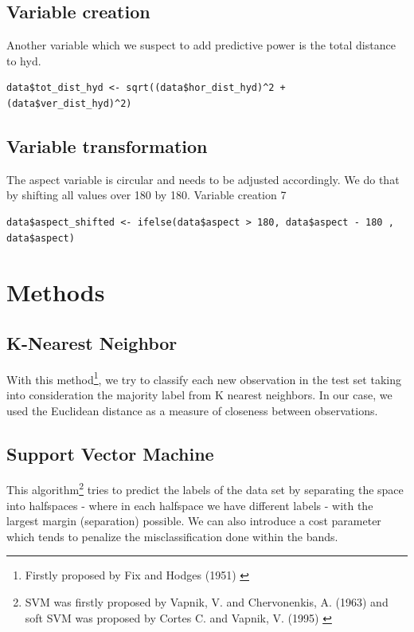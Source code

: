 \documentclass[paper=a4, fontsize=12pt]{scrartcl}
\numberwithin{equation}{section}
\numberwithin{figure}{section}
\numberwithin{table}{section}
\begin{document}
\subsection{Variable creation}
Another variable which we suspect to add predictive power is the total distance to hyd.\\
\begin{lstlisting}
data$tot_dist_hyd <- sqrt((data$hor_dist_hyd)^2 + (data$ver_dist_hyd)^2)
\end{lstlisting}

\subsection{Variable transformation}
The aspect variable is circular and needs to be adjusted accordingly. We do that by shifting all values over 180 by 180.
Variable creation 7
\begin{lstlisting}
data$aspect_shifted <- ifelse(data$aspect > 180, data$aspect - 180 , data$aspect)
\end{lstlisting}





\newpage




\section{Methods}
\subsection{K-Nearest Neighbor}
With this method\footnote{Firstly proposed by Fix and Hodges (1951) \cite{knn}}, we try to classify each new observation in the test set taking into consideration the majority label from K nearest neighbors. In our case, we used the Euclidean distance as a measure of closeness between observations.


\subsection{Support Vector Machine}
This algorithm\footnote{SVM was firstly proposed by  Vapnik, V. and Chervonenkis, A. (1963) and soft SVM was proposed by  Cortes C. and Vapnik, V. (1995) \cite{vap}}  tries to predict the labels of the data set by separating the space into halfspaces - where in each halfspace we have different labels - with the largest margin (separation) possible. We can also introduce a cost parameter which tends to penalize the misclassification done within the bands. 
\end{document}
